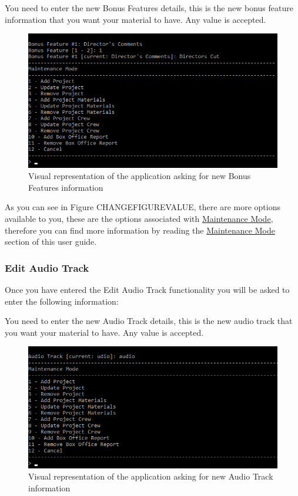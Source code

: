 \documentclass[
  english,
  a4paper,
,tablecaptionabove
]{scrartcl}
\begin{document}
You need to enter the new Bonus Features details, this is the new bonus
feature information that you want your material to have. Any value is
accepted.

\begin{figure}
\centering
\includegraphics{images/user-guide/maintenance-mode/update-project-material-bonus-feature.png}
\caption{Visual representation of the application asking for new Bonus
Features information}
\end{figure}

As you can see in Figure CHANGEFIGUREVALUE, there are more options
available to you, these are the options associated with
\protect\hyperlink{using-maintenance-mode}{Maintenance Mode}, therefore
you can find more information by reading the
\protect\hyperlink{using-maintenance-mode}{Maintenance Mode} section of
this user guide.

\newpage

\hypertarget{edit-audio-track}{%
\subsubsection{Edit Audio Track}\label{edit-audio-track}}

Once you have entered the Edit Audio Track functionality you will be
asked to enter the following information:

You need to enter the new Audio Track details, this is the new audio
track that you want your material to have. Any value is accepted.

\begin{figure}
\centering
\includegraphics{images/user-guide/maintenance-mode/update-project-materials-audio-track.png}
\caption{Visual representation of the application asking for new Audio
Track information}
\end{figure}
\end{document}
